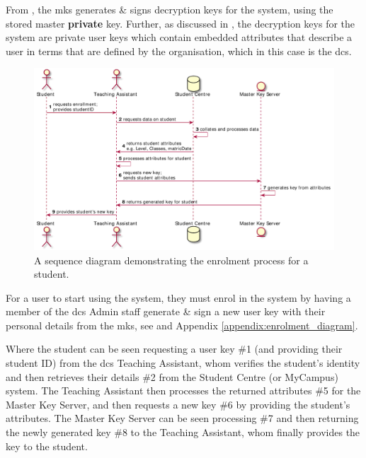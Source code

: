 From , the \acrfull{mks} generates \& signs decryption keys for the \theResServer system, using the stored master \textbf{private} key. Further, as discussed in , the decryption keys for the system are private user keys which contain embedded attributes that describe a user in terms that are defined by the organisation, which in this case is the \acrshort{dcs}.

\begin{figure}[htp]
    \centering
    \includegraphics[width=\linewidth,keepaspectratio]{images/flow_of_info/enrollment_stu_sequence.pdf}

    \caption{A sequence diagram demonstrating the \theResServer enrolment process for a student.}

    \label{fig:enrolment_diagram}
\end{figure}

For a user to start using the \theResServer system, they must enrol in the system by having a member of the \acrshort{dcs} Admin staff generate \& sign a new user key with their personal details from the \acrshort{mks}, see  and Appendix \ref{appendix:enrolment_diagram}.

Where the student can be seen requesting a user key \#1 (and providing their student ID) from the \acrshort{dcs} Teaching Assistant, whom verifies the student's identity and then retrieves their details \#2 from the Student Centre (or MyCampus) system. The Teaching Assistant then processes the returned attributes \#5 for the Master Key Server, and then requests a new key \#6 by providing the student's attributes. The Master Key Server can be seen processing \#7 and then returning the newly generated key \#8 to the Teaching Assistant, whom finally provides the key to the student.

